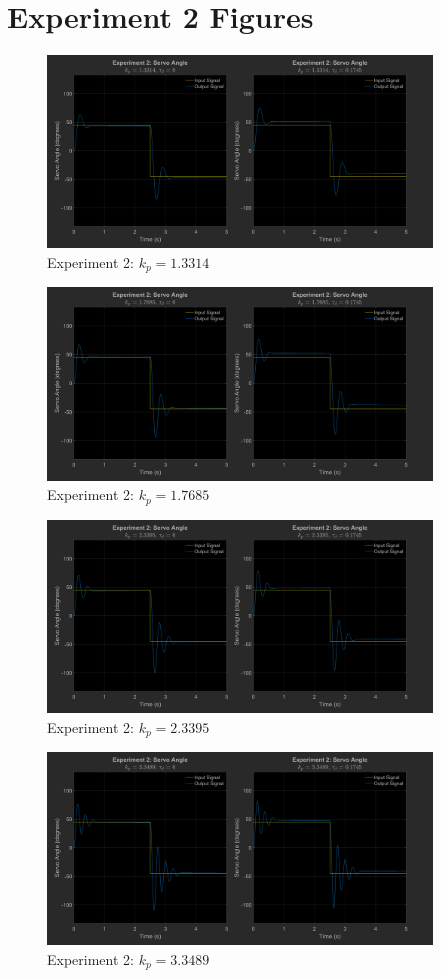 \documentclass[12pt]{article}
\begin{document}
\section{Experiment 2 Figures} \label{sec:exp2fig}
\begin{figure}[h]
    \centering
    \includegraphics[width=0.91\textwidth]{exp2_kp1.3314}
    \caption{Experiment 2: $k_p = 1.3314$}
\end{figure}
\begin{figure}[h]
    \centering
    \includegraphics[width=0.91\textwidth]{exp2_kp1.7685}
    \caption{Experiment 2: $k_p = 1.7685$}
\end{figure}
\begin{figure}[h]
    \centering
    \includegraphics[width=0.91\textwidth]{exp2_kp2.3395}
    \caption{Experiment 2: $k_p = 2.3395$}
\end{figure}
\begin{figure}[h]
    \centering
    \includegraphics[width=0.91\textwidth]{exp2_kp3.3489}
    \caption{Experiment 2: $k_p = 3.3489$}
\end{figure}
\end{document}
